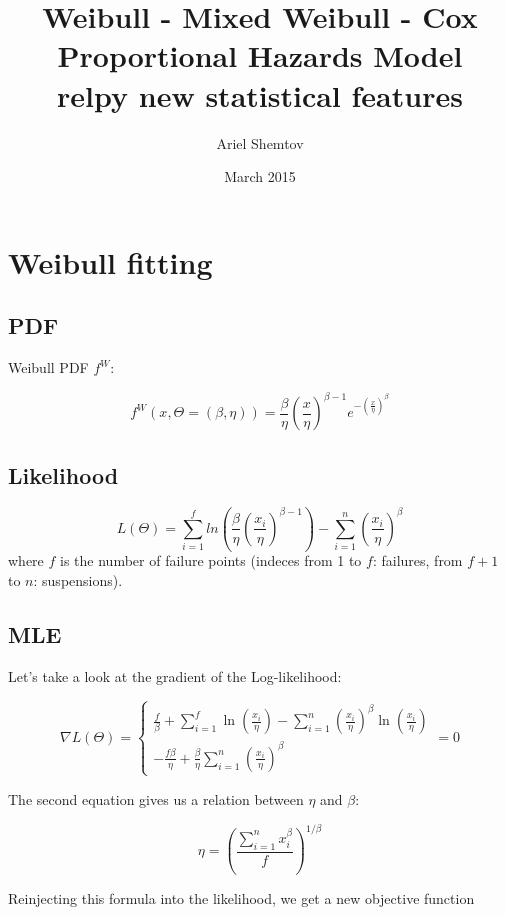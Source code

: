 \documentclass[a4paper,11pt]{article}
\begin{document}
\title{Weibull - Mixed Weibull - Cox Proportional Hazards Model \\ relpy new statistical features}
\author{Ariel Shemtov}
\date{March 2015}
\maketitle


\section{Weibull fitting}

\subsection{PDF}
Weibull PDF $f^W$:

$$ f^{W} (x,\Theta=(\beta,\eta)) =  \frac{\beta}{\eta} \left( \frac{x}{\eta} \right)^{\beta-1} e^{-(\frac{x}{\eta})^{\beta}} $$

\subsection{Likelihood}

\[
L(\Theta) = \sum_{i=1}^f ln\left( \frac{\beta}{\eta} (\frac{x_i}{\eta})^{\beta-1} \right) - \sum_{i=1}^{n} \left( \frac{x_i}{\eta}\right)^{\beta} 
\]
where $f$ is the number of failure points (indeces from 1 to $f$: failures, from $f+1$ to $n$: suspensions).

\subsection{MLE}


Let's take a look at the gradient of the Log-likelihood:


$$
\nabla L(\Theta) =
\begin{cases}
\frac{f}{\beta} + \sum\limits_{i=1}^f \ln\left( \frac{x_i}{\eta} \right) - \sum\limits_{i=1}^n \left(\frac{x_i}{\eta}\right)^{\beta} \ln\left( \frac{x_i}{\eta} \right) \\
-\frac{f\beta}{\eta} + \frac{\beta}{\eta} \sum\limits_{i=1}^{n} \left(\frac{x_i}{\eta}\right)^{\beta}
\end{cases}
= 0
$$

The second equation gives us a relation between $\eta$ and $\beta$:

$$
\eta = \left( \frac{\sum\limits_{i=1}^n x_i^{\beta}}{f} \right)^{1/\beta}
$$

Reinjecting this formula into the likelihood, we get a new objective function 
\end{document}

